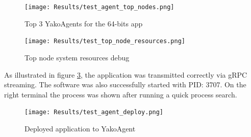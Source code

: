             \begin{figure}[H]
                \centering
                \texttt{[image: Results/test\_agent\_top\_nodes.png]}
                \caption{Top 3 YakoAgents for the 64-bits app}
                \label{fig:test_agent_top_nodes}
            \end{figure}

            \begin{figure}[H]
                \centering
                \texttt{[image: Results/test\_top\_node\_resources.png]}
                \caption{Top node system resources debug}
                \label{fig:test_top_node_resources}
            \end{figure}
            
            As illustrated in figure \ref{fig:test_agent_deploy}, the application was transmitted correctly via gRPC streaming. The software was also successfully started with PID: 3707. On the right terminal the process was shown after running a quick process search.
            
            \begin{figure}[H]
                \centering
                \texttt{[image: Results/test\_agent\_deploy.png]}
                \caption{Deployed application to YakoAgent}
                \label{fig:test_agent_deploy}
            \end{figure}